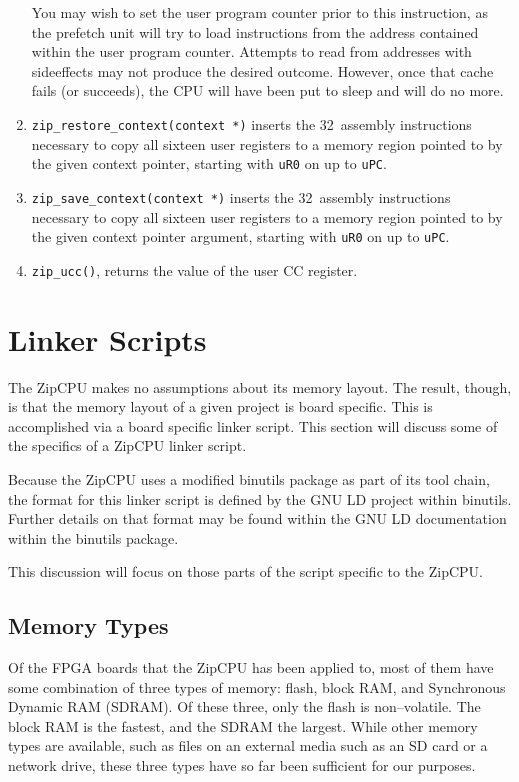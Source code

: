 \documentclass{gqtekspec}
\begin{document}
\begin{enumerate}
	You may wish to set the user program counter prior to this instruction,
	as the prefetch unit will try to load instructions from the address
	contained within the user program counter.  Attempts to read from 
	addresses with sideeffects may not produce the desired outcome. 
	However, once that cache fails (or succeeds), the CPU will have been
	put to sleep and will do no more.

\item {\tt zip\_restore\_context(context *)} inserts the 32~assembly
	instructions necessary to copy all sixteen user registers to a memory
	region pointed to by the given context pointer, starting with {\tt uR0}
	on up to {\tt uPC}.

\item {\tt zip\_save\_context(context *)} inserts the 32~assembly instructions
	necessary to copy all sixteen user registers to a memory region pointed
	to by the given context pointer argument, starting
	with {\tt uR0} on up to {\tt uPC}.
\item {\tt zip\_ucc()}, returns the value of the user CC register.
\end{enumerate}

%
\section{Linker Scripts}\label{sec:ld}
The ZipCPU makes no assumptions about its memory layout.  The result, though,
is that the memory layout of a given project is board specific.  This
is accomplished via a board specific linker script.  This section will discuss
some of the specifics of a ZipCPU linker script.

Because the ZipCPU uses a modified binutils package as part of its tool chain,
the format for this linker script is defined by the GNU LD project within
binutils.  Further details on that format may be found within the GNU LD 
documentation within the binutils package.

This discussion will focus on those parts of the script specific to the ZipCPU.

\subsection{Memory Types}\label{sec:ld-mem}
Of the FPGA boards that the ZipCPU has been applied to, most of them have some
combination of three types of memory: flash, block RAM, and Synchronous 
Dynamic RAM (SDRAM).  Of these three, only the flash is non--volatile.  The
block RAM is the fastest, and the SDRAM the largest.  While other memory types
are available, such as files on an external media such as an SD card or a 
network drive, these three types have so far been sufficient for our purposes.
\end{document}
